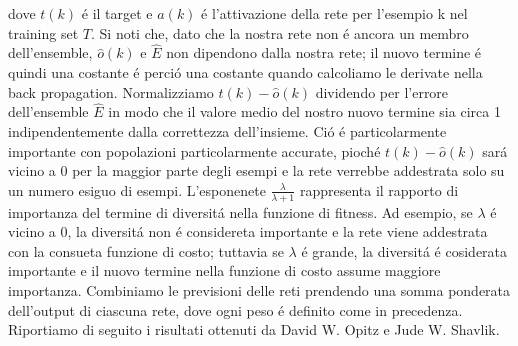 \documentclass[a4paper,10pt]{article}
\begin{document}
  dove $t(k)$ \'e il target e $a(k)$ \'e l'attivazione della rete per l'esempio k nel training set $T$. Si noti che, dato che la nostra rete non \'e ancora un membro dell'ensemble, $\hat{o} (k)$ e $\hat{E}$ non dipendono dalla nostra rete; il nuovo termine \'e quindi una costante \'e perci\'o una costante quando calcoliamo le derivate nella back propagation. Normalizziamo $t(k) - \hat{o} (k)$ dividendo per l'errore dell'ensemble $\hat{E}$ in modo che il valore medio del nostro nuovo termine sia circa 1 indipendentemente dalla correttezza dell'insieme. Ci\'o \'e particolarmente importante con popolazioni particolarmente accurate, pioch\'e $t(k) - \hat{o} (k)$ sar\'a vicino a 0 per la maggior parte degli esempi e la rete verrebbe addestrata solo su un numero esiguo di esempi. L'esponenete $\frac{\lambda}{\lambda + 1}$ rappresenta il rapporto di importanza del termine di diversit\'a nella funzione di fitness. Ad esempio, se $\lambda$ \'e vicino a 0, la diversit\'a non \'e considereta importante e la rete viene addestrata con la consueta funzione di costo; tuttavia se $\lambda$ \'e grande, la diversit\'a \'e cosiderata importante e il nuovo termine nella funzione di costo assume maggiore importanza. Combiniamo le previsioni delle reti prendendo una somma ponderata dell'output di ciascuna rete, dove ogni peso \'e definito come in precedenza. Riportiamo di seguito i risultati ottenuti da David W. Opitz e Jude W. Shavlik.
\end{document}
